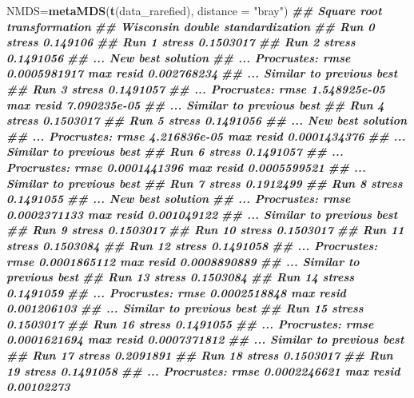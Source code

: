 \documentclass[
]{article}
\newenvironment{Shaded}{\begin{snugshade}}{\end{snugshade}}
\newcommand{\AttributeTok}[1]{\textcolor[rgb]{0.13,0.29,0.53}{#1}}
\newcommand{\DocumentationTok}[1]{\textcolor[rgb]{0.56,0.35,0.01}{\textbf{\textit{#1}}}}
\newcommand{\FunctionTok}[1]{\textcolor[rgb]{0.13,0.29,0.53}{\textbf{#1}}}
\newcommand{\NormalTok}[1]{#1}
\newcommand{\OtherTok}[1]{\textcolor[rgb]{0.56,0.35,0.01}{#1}}
\newcommand{\StringTok}[1]{\textcolor[rgb]{0.31,0.60,0.02}{#1}}
\begin{document}
\begin{Shaded}
\begin{Highlighting}[]
\NormalTok{NMDS}\OtherTok{=}\FunctionTok{metaMDS}\NormalTok{(}\FunctionTok{t}\NormalTok{(data\_rarefied), }\AttributeTok{distance =} \StringTok{"bray"}\NormalTok{)}
\DocumentationTok{\#\# Square root transformation}
\DocumentationTok{\#\# Wisconsin double standardization}
\DocumentationTok{\#\# Run 0 stress 0.149106 }
\DocumentationTok{\#\# Run 1 stress 0.1503017 }
\DocumentationTok{\#\# Run 2 stress 0.1491056 }
\DocumentationTok{\#\# ... New best solution}
\DocumentationTok{\#\# ... Procrustes: rmse 0.0005981917  max resid 0.002768234 }
\DocumentationTok{\#\# ... Similar to previous best}
\DocumentationTok{\#\# Run 3 stress 0.1491057 }
\DocumentationTok{\#\# ... Procrustes: rmse 1.548925e{-}05  max resid 7.090235e{-}05 }
\DocumentationTok{\#\# ... Similar to previous best}
\DocumentationTok{\#\# Run 4 stress 0.1503017 }
\DocumentationTok{\#\# Run 5 stress 0.1491056 }
\DocumentationTok{\#\# ... New best solution}
\DocumentationTok{\#\# ... Procrustes: rmse 4.216836e{-}05  max resid 0.0001434376 }
\DocumentationTok{\#\# ... Similar to previous best}
\DocumentationTok{\#\# Run 6 stress 0.1491057 }
\DocumentationTok{\#\# ... Procrustes: rmse 0.0001441396  max resid 0.0005599521 }
\DocumentationTok{\#\# ... Similar to previous best}
\DocumentationTok{\#\# Run 7 stress 0.1912499 }
\DocumentationTok{\#\# Run 8 stress 0.1491055 }
\DocumentationTok{\#\# ... New best solution}
\DocumentationTok{\#\# ... Procrustes: rmse 0.0002371133  max resid 0.001049122 }
\DocumentationTok{\#\# ... Similar to previous best}
\DocumentationTok{\#\# Run 9 stress 0.1503017 }
\DocumentationTok{\#\# Run 10 stress 0.1503017 }
\DocumentationTok{\#\# Run 11 stress 0.1503084 }
\DocumentationTok{\#\# Run 12 stress 0.1491058 }
\DocumentationTok{\#\# ... Procrustes: rmse 0.0001865112  max resid 0.0008890889 }
\DocumentationTok{\#\# ... Similar to previous best}
\DocumentationTok{\#\# Run 13 stress 0.1503084 }
\DocumentationTok{\#\# Run 14 stress 0.1491059 }
\DocumentationTok{\#\# ... Procrustes: rmse 0.0002518848  max resid 0.001206103 }
\DocumentationTok{\#\# ... Similar to previous best}
\DocumentationTok{\#\# Run 15 stress 0.1503017 }
\DocumentationTok{\#\# Run 16 stress 0.1491055 }
\DocumentationTok{\#\# ... Procrustes: rmse 0.0001621694  max resid 0.0007371812 }
\DocumentationTok{\#\# ... Similar to previous best}
\DocumentationTok{\#\# Run 17 stress 0.2091891 }
\DocumentationTok{\#\# Run 18 stress 0.1503017 }
\DocumentationTok{\#\# Run 19 stress 0.1491058 }
\DocumentationTok{\#\# ... Procrustes: rmse 0.0002246621  max resid 0.00102273 }

\end{Highlighting}
\end{Shaded}
\end{document}
